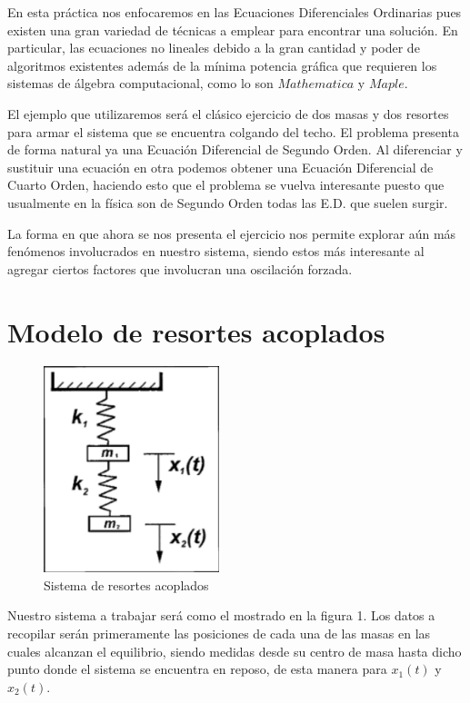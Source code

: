 En esta práctica nos enfocaremos en las Ecuaciones Diferenciales Ordinarias pues existen una gran variedad de técnicas a emplear para encontrar una solución. En particular, las ecuaciones no lineales debido a la gran cantidad y poder de algoritmos existentes además de la mínima potencia gráfica que requieren los sistemas de álgebra computacional, como lo son $Mathematica$ y $Maple$.

El ejemplo que utilizaremos será el clásico ejercicio de dos masas y dos resortes para armar el sistema que se encuentra colgando del techo. El problema presenta de forma natural ya una Ecuación Diferencial de Segundo Orden. Al diferenciar y sustituir una ecuación en otra podemos obtener una Ecuación Diferencial de Cuarto Orden, haciendo esto que el problema se vuelva interesante puesto que usualmente en la física son de Segundo Orden todas las E.D. que suelen surgir.

La forma en que ahora se nos presenta el ejercicio nos permite explorar aún más fenómenos involucrados en nuestro sistema, siendo estos más interesante al agregar ciertos factores que involucran una oscilación forzada.

\section{Modelo de resortes acoplados}

\begin{figure}[h!]
	\begin{center}
	\includegraphics[height=6cm]{SistRes}
    \caption{Sistema de resortes acoplados}
	\end{center}
\end{figure}

\noindent Nuestro sistema a trabajar será como el mostrado en la figura 1. Los datos a recopilar serán primeramente las posiciones de cada una de las masas en las cuales alcanzan el equilibrio, siendo medidas desde su centro de masa hasta dicho punto donde el sistema se encuentra en reposo, de esta manera para $x_1(t)$ y $x_2(t)$. \\

